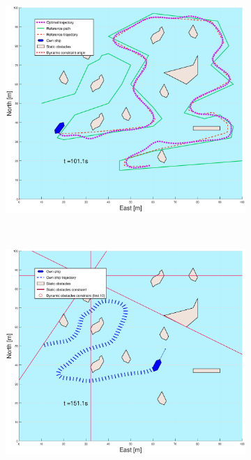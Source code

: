 \begin{figure}[!ht]
\begin{subfigure}[b]{0.499\textwidth}
        \includegraphics[width=\textwidth]{Images/Figures/skjergard_u_trafikk/_Simple_1fig999_time=101}
    \end{subfigure}
    \hfill
    \\
    \begin{subfigure}[b]{0.49\textwidth}
        \centering
        \includegraphics[width=\textwidth]{Images/Figures/skjergard_u_trafikk/_Simple_1fig1_time=151}
    \end{subfigure}

\end{figure}
